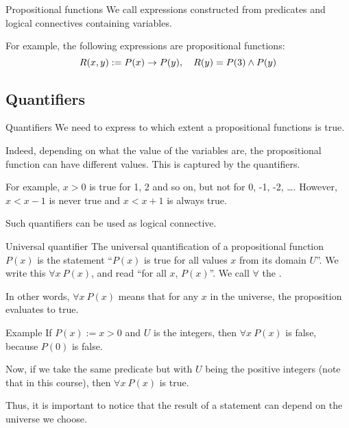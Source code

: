 \documentclass{article}
\begin{document}
\begin{parag}{Propositional functions}
    We call  expressions constructed from predicates and logical connectives containing variables.

    For example, the following expressions are propositional functions: 
    \[R\left(x, y\right) := P\left(x\right) \to P\left(y\right), \mathspace R\left(y\right) = P\left(3\right) \land P\left(y\right)\]
\end{parag}

\subsection{Quantifiers}
\begin{parag}{Quantifiers}
    We need  to express to which extent a propositional functions is true.

    Indeed, depending on what the value of the variables are, the propositional function can have different values. This is captured by the quantifiers.

    For example, $x > 0$ is true for 1, 2 and so on, but not for 0, -1, -2, \ldots. However, $x < x - 1$ is never true and $x < x + 1$ is always true.

    Such quantifiers can be used as logical connective.
\end{parag}

\begin{parag}{Universal quantifier}
    The universal quantification of a propositional function $P\left(x\right)$ is the statement ``$P\left(x\right)$ is true for all values $x$ from its domain $U$''. We write this $\forall x\ P\left(x\right)$, and read ``for all $x$, $P\left(x\right)$''. We call $\forall$ the .

    In other words, $\forall x\ P\left(x\right)$ means that for any $x$ in the universe, the proposition evaluates to true.
\end{parag}

\begin{parag}{Example}
    If $P\left(x\right) := x > 0$ and $U$ is the integers, then $\forall x\ P\left(x\right)$ is false, because $P\left(0\right)$ is false.

    Now, if we take the same predicate but with $U$ being the positive integers (note that \textit{} in this course), then $\forall x\ P\left(x\right)$ is true.

    Thus, it is important to notice that the result of a statement can depend on the universe we choose.
\end{parag}
\end{document}
